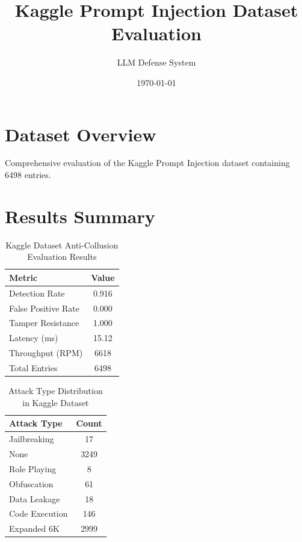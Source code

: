 \documentclass{article}
\title{Kaggle Prompt Injection Dataset Evaluation}
\author{LLM Defense System}
\date{\today}
\begin{document}
\maketitle

\section{Dataset Overview}
Comprehensive evaluation of the Kaggle Prompt Injection dataset containing 6498 entries.

\section{Results Summary}

\begin{table}[h!]
\centering
\caption{Kaggle Dataset Anti-Collusion Evaluation Results}
\label{tab:kaggle_results}
\begin{tabular}{|l|c|}
\hline
\textbf{Metric} & \textbf{Value} \\
\hline
Detection Rate & 0.916 \\
False Positive Rate & 0.000 \\
Tamper Resistance & 1.000 \\
Latency (ms) & 15.12 \\
Throughput (RPM) & 6618 \\
Total Entries & 6498 \\
\hline
\end{tabular}
\end{table}

\begin{table}[h!]
\centering
\caption{Attack Type Distribution in Kaggle Dataset}
\label{tab:attack_distribution}
\begin{tabular}{|l|c|}
\hline
\textbf{Attack Type} & \textbf{Count} \\
\hline
Jailbreaking & 17 \\
None & 3249 \\
Role Playing & 8 \\
Obfuscation & 61 \\
Data Leakage & 18 \\
Code Execution & 146 \\
Expanded 6K & 2999 \\
\hline
\end{tabular}
\end{table}
\end{document}
